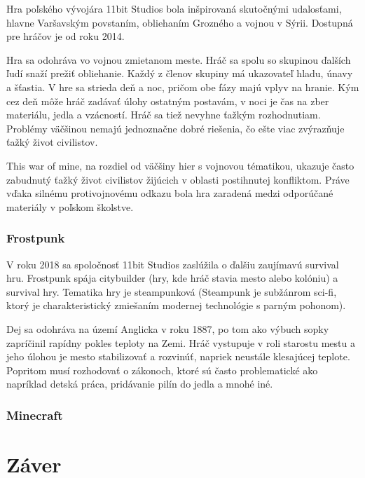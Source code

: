 \documentclass[10pt,oneoside,slovak,a4paper]{article}
\begin{document}
Hra poľského vývojára 11bit Studios bola inšpirovaná skutočnými udalosťami, hlavne Varšavským povstaním, obliehaním Grozného a vojnou v Sýrii. Dostupná pre hráčov je od roku 2014.\cite{PL}

Hra sa odohráva vo  vojnou zmietanom meste. Hráč sa spolu so skupinou ďalších ľudí snaží prežiť obliehanie. Každý z členov skupiny má ukazovateľ hladu, únavy a šťastia. V hre sa strieda deň a noc, pričom obe fázy majú vplyv na hranie. Kým cez deň môže hráč zadávať úlohy ostatným  postavám, v noci je čas na zber materiálu, jedla a vzácností.
Hráč sa tiež nevyhne ťažkým rozhodnutiam. Problémy väčšinou nemajú jednoznačne dobré riešenia, čo ešte viac zvýrazňuje ťažký život civilistov.\cite{Pergerson}

This war of mine, na rozdiel od väčšiny hier s vojnovou tématikou, ukazuje často zabudnutý ťažký život civilistov žijúcich v oblasti postihnutej konfliktom. Práve vďaka silnému protivojnovému odkazu bola hra zaradená  medzi odporúčané materiály v poľskom školstve. \cite{PL}

\subsubsection{Frostpunk}

V roku 2018 sa spoločnosť 11bit Studios zaslúžila o ďalšiu zaujímavú survival hru. Frostpunk spája citybuilder (hry, kde hráč stavia mesto alebo kolóniu) a survival hry. Tematika hry je steampunková (Steampunk je subžánrom sci-fi, ktorý je charakteristický zmiešaním modernej technológie s parným pohonom).\cite{Salo}

Dej sa odohráva na území Anglicka v roku 1887, po tom ako výbuch sopky zapríčinil rapídny pokles teploty na Zemi.
Hráč vystupuje v roli starostu mestu a jeho úlohou je mesto stabilizovať a rozvinúť, napriek neustále klesajúcej teplote. Popritom  musí rozhodovať o zákonoch, ktoré sú často problematické ako napríklad detská práca, pridávanie pilín do jedla a mnohé iné.\cite{Salo}\cite{FW}



\subsubsection{Minecraft}


\section{Záver} \label{zaver} %




\newpage

\end{document}
